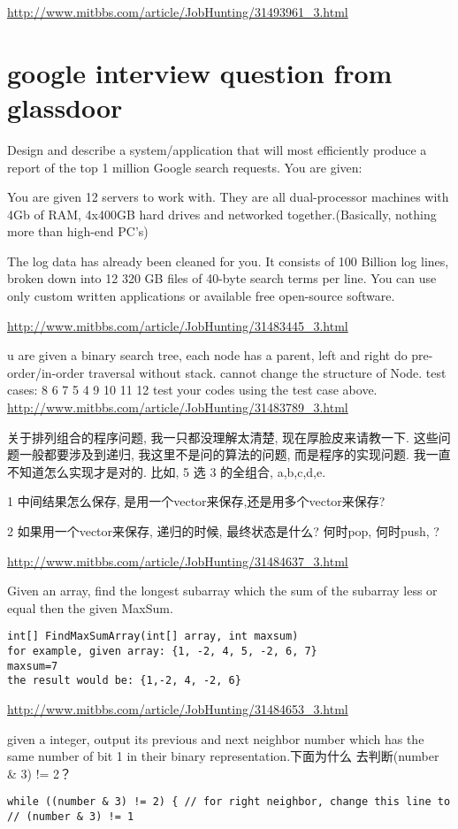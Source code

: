 \documentclass[12pt]{book}
\begin{document}
\url{http://www.mitbbs.com/article/JobHunting/31493961_3.html}
\chapter{google interview question from glassdoor}
\label{sec-23}
Design and describe a system/application that will most efficiently produce 
a report of the top 1 million Google search requests. You are given:

You are given 12 servers to work with. They are all dual-processor machines 
with 4Gb of RAM, 4x400GB hard drives and networked together.(Basically, 
nothing more than high-end PC's)

The log data has already been cleaned for you. It consists of 100 Billion 
log lines, broken down into 12 320 GB files of 40-byte search terms per line.
You can use only custom written applications or available free open-source 
software.

\url{http://www.mitbbs.com/article/JobHunting/31483445_3.html}

u are given a binary search tree,
each node has a parent, left and right
do pre-order/in-order traversal without stack.
cannot change the structure of Node.
test cases: 8  6  7  5  4  9  10  11  12
test your codes using the test case above.
\url{http://www.mitbbs.com/article/JobHunting/31483789_3.html}

关于排列组合的程序问题, 我一只都没理解太清楚, 现在厚脸皮来请教一下. 这些问题一般都要涉及到递归, 我这里不是问的算法的问题, 而是程序的实现问题. 我一直不知道怎么实现才是对的. 比如, 5 选 3 的全组合, a,b,c,d,e. 

1 中间结果怎么保存, 是用一个vector来保存,还是用多个vector来保存?

2 如果用一个vector来保存, 递归的时候, 最终状态是什么? 何时pop, 何时push, ?

\url{http://www.mitbbs.com/article/JobHunting/31484637_3.html}

Given an array, find the longest subarray which the sum of the
subarray less or equal then the given MaxSum.
\lstset{language=java,label= ,caption= ,numbers=none}
\begin{lstlisting}
int[] FindMaxSumArray(int[] array, int maxsum)
for example, given array: {1, -2, 4, 5, -2, 6, 7}
maxsum=7
the result would be: {1,-2, 4, -2, 6}
\end{lstlisting}

\url{http://www.mitbbs.com/article/JobHunting/31484653_3.html}

given a integer, output its previous and next neighbor number which
has the same number of bit 1 in their binary representation.下面为什么
去判断(number \& 3) != 2？
\lstset{language=java,label= ,caption= ,numbers=none}
\begin{lstlisting}
while ((number & 3) != 2) { // for right neighbor, change this line to 
// (number & 3) != 1
\end{lstlisting}
\end{document}
